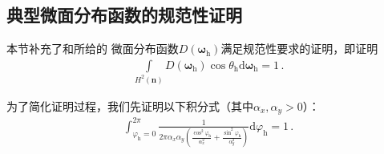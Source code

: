 \subsection{典型微面分布函数的规范性证明}\label{sub:典型微面分布函数的规范性证明}
本节补充了和所给的
微面分布函数$D({\bm\omega}_{\mathrm{h}})$满足规范性要求的证明，即证明
\begin{align}\label{eq:8.ex-01}
    \int\limits_{H^2({\bm n})}D({\bm\omega}_{\mathrm{h}})\cos\theta_{\mathrm{h}}\mathrm{d}{\bm\omega}_{\mathrm{h}}=1\, .
\end{align}

为了简化证明过程，我们先证明以下积分式（其中$\alpha_x,\alpha_y>0$）：
\begin{align}\label{eq:8.ex-02}
    \int_{\varphi_{\mathrm{h}}=0}^{2\pi}\frac{1}{2\pi\alpha_x\alpha_y\left(\frac{\cos^2\varphi_{\mathrm{h}}}{\alpha_x^2}+\frac{\sin^2\varphi_{\mathrm{h}}}{\alpha_y^2}\right)}\mathrm{d}\varphi_{\mathrm{h}}=1\, .
\end{align}
